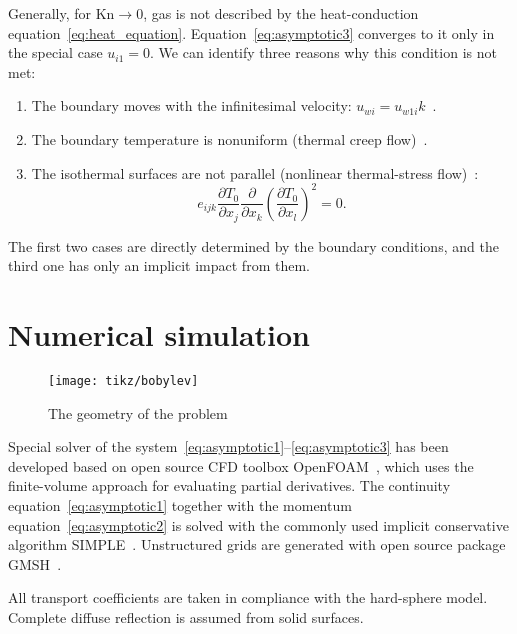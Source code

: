 \documentclass[english,a4paper,10pt]{article}
\newcommand{\Kn}{\mathrm{Kn}}
\newcommand{\pder}[2][]{\frac{\partial#1}{\partial#2}}
\begin{document}
Generally, for \(\Kn\to0\), gas is not described by the heat-conduction equation~\eqref{eq:heat_equation}.
Equation~\eqref{eq:asymptotic3} converges to it only in the special case \(u_{i1} = 0\).
We can identify three reasons why this condition is not met:
\begin{enumerate}
	\item The boundary moves with the infinitesimal velocity: \(u_{wi} = u_{w1i} k\)~\cite{Bobylev1996}.
	\item The boundary temperature is nonuniform (thermal creep flow)~\cite{Bobylev1996}.
	\item The isothermal surfaces are not parallel (nonlinear thermal-stress flow)~\cite{Kogan1976}:
		\begin{equation}\label{eq:equilibrium}
			e_{ijk}\pder[T_0]{x_j}\pder{x_k}\left(\pder[T_0]{x_l}\right)^2 = 0.
		\end{equation}
\end{enumerate}

The first two cases are directly determined by the boundary conditions,
and the third one has only an implicit impact from them.

\section{Numerical simulation}

\begin{wrapfigure}{r}{6cm}
	\vspace{-20pt}
	\centering
	\texttt{[image: tikz/bobylev]}
	\vspace{-20pt}
	\caption{The geometry of the problem}\label{fig:geometry}
	\vspace{-5pt}
\end{wrapfigure}

Special solver of the system~\eqref{eq:asymptotic1}--\eqref{eq:asymptotic3}
has been developed based on open source CFD toolbox OpenFOAM\textregistered{}~\cite{Tabor1998},
which uses the finite-volume approach for evaluating partial derivatives.
The continuity equation~\eqref{eq:asymptotic1} together with the momentum equation~\eqref{eq:asymptotic2}
is solved with the commonly used implicit conservative algorithm SIMPLE~\cite{Caretto1972}.
Unstructured grids are generated with open source package GMSH~\cite{Geuzaine2009}.

All transport coefficients are taken in compliance with the hard-sphere model.
Complete diffuse reflection is assumed from solid surfaces.
\end{document}
